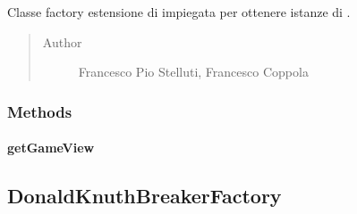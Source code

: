 \documentclass[letterpaper,10pt,italian,openany,oneside]{sphinxmanual}
\begin{document}
\begin{fulllineitems}
\label{\detokenize{test/it/unicam/cs/pa/mastermind/factories/ConsoleGameViewFactory:it.unicam.cs.pa.mastermind.factories.ConsoleGameViewFactory}}
Classe factory estensione di  impiegata per ottenere istanze di .
\begin{quote}\begin{description}
\item[{Author}] \leavevmode
Francesco Pio Stelluti, Francesco Coppola

\end{description}\end{quote}

\end{fulllineitems}



\subsubsection{Methods}
\label{\detokenize{test/it/unicam/cs/pa/mastermind/factories/ConsoleGameViewFactory:methods}}

\paragraph{getGameView}
\label{\detokenize{test/it/unicam/cs/pa/mastermind/factories/ConsoleGameViewFactory:getgameview}}

\begin{fulllineitems}
\label{\detokenize{test/it/unicam/cs/pa/mastermind/factories/ConsoleGameViewFactory:it.unicam.cs.pa.mastermind.factories.ConsoleGameViewFactory.getGameView()}}
\end{fulllineitems}



\subsection{DonaldKnuthBreakerFactory}
\label{\detokenize{test/it/unicam/cs/pa/mastermind/factories/DonaldKnuthBreakerFactory:donaldknuthbreakerfactory}}\label{\detokenize{test/it/unicam/cs/pa/mastermind/factories/DonaldKnuthBreakerFactory::doc}}
\end{document}
